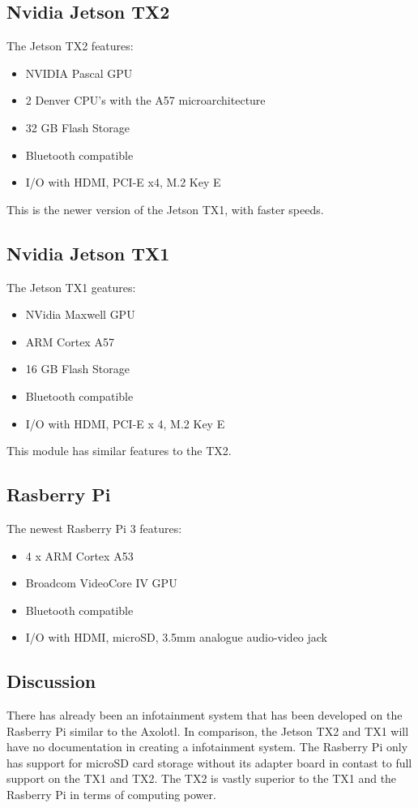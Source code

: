\documentclass[onecolumn, draftclsnofoot,10pt, compsoc]{IEEEtran}
\begin{document}
\subsection{Nvidia Jetson TX2}
The Jetson TX2 features:
\begin{itemize}
    \item NVIDIA Pascal GPU
    \item 2 Denver CPU's with the A57 microarchitecture
    \item 32 GB Flash Storage
    \item Bluetooth compatible
    \item I/O with HDMI, PCI-E x4, M.2 Key E
\end{itemize}
This is the newer version of the Jetson TX1, with faster speeds. 

\subsection{Nvidia Jetson TX1}
The Jetson TX1 geatures:
\begin{itemize}
    \item NVidia Maxwell GPU
    \item ARM Cortex A57
    \item 16 GB Flash Storage
    \item Bluetooth compatible
    \item I/O with HDMI, PCI-E x 4, M.2 Key E
\end{itemize}
This module has similar features to the TX2.

\subsection{Rasberry Pi}
The newest Rasberry Pi 3 features:
\begin{itemize}
    \item 4 x ARM Cortex A53
    \item Broadcom VideoCore IV GPU
    \item Bluetooth compatible
    \item I/O with HDMI, microSD, 3.5mm analogue audio-video jack
\end{itemize}
\subsection{Discussion}
There has already been an infotainment system that has been developed on the Rasberry Pi similar to the Axolotl. In comparison, the Jetson TX2 and TX1 will have no documentation in creating a infotainment system. 
The Rasberry Pi only has support for microSD card storage without its adapter board in contast to full support on the TX1 and TX2. 
The TX2 is vastly superior to the TX1 and the Rasberry Pi in terms of computing power. 
\end{document}
